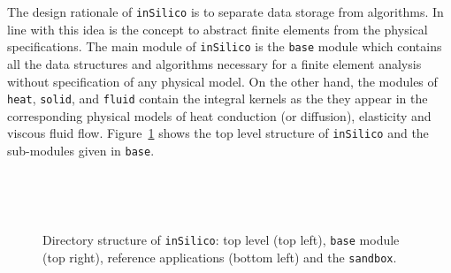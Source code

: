 \documentclass[a4paper,DIV=12,10pt]{scrartcl}
\newcommand{\IS}[0]{\texttt{inSilico}}
\begin{document}
The design rationale of \IS{} is to separate data storage from
algorithms. In line with this idea is the concept to abstract finite
elements from the physical specifications. The main module of \IS{} is
the \texttt{base} module which contains all the data structures and
algorithms necessary for a finite element analysis without
specification of any physical model. On the other hand, the modules of
\texttt{heat}, \texttt{solid}, and \texttt{fluid} contain the integral
kernels as the they appear in the corresponding physical models of
heat conduction (or diffusion), elasticity and viscous fluid flow.
Figure~\ref{fig:structure} shows the top level structure of \IS{} and
the sub-modules given in \texttt{base}.

\begin{figure}[htbp]
  \centering
  \begin{minipage}[t]{0.6\textwidth}
    \vspace{0pt}
    \\[1cm]
    \centering
    
  \end{minipage}%
  \begin{minipage}[t]{0.4\textwidth}
    \vspace{0pt}
    \\[1cm]
    \fbox{
      
    }
  \end{minipage}

  \caption{Directory structure of \IS: top level (top left),
    \texttt{base} module (top right), reference applications (bottom
    left) and the \texttt{sandbox}.}
  \label{fig:structure}
\end{figure}
\end{document}
